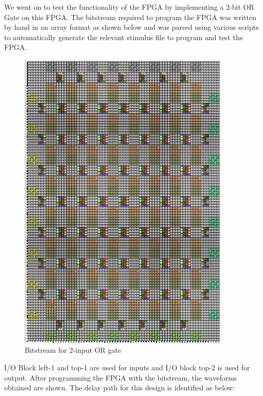 We went on to test the functionality of the FPGA by implementing a 2-bit OR Gate on this FPGA. The bitstream required to program the FPGA was written by hand in an array format as shown below and was parsed using various scripts to automatically generate the relevant stimulus file to program and test the FPGA.

\begin{figure}[H]
\centering
\includegraphics[width=0.9\textwidth]{fpga_bitstream.png}
\caption{Bitstream for 2-input OR gate}
\label{fig:Figure}
\end{figure}

I/O Block left-1 and top-1 are used for inputs and I/O block top-2 is used for output. After programming the FPGA with the bitstream, the waveforms obtained are shown. The delay path for this design is identified as below:

